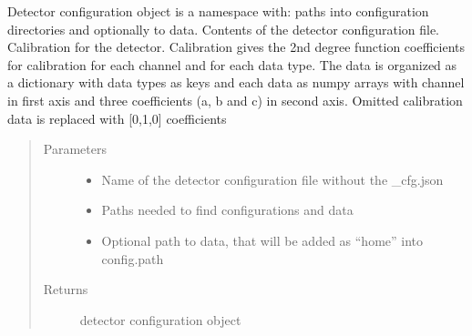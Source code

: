 \documentclass[letterpaper,10pt,english]{sphinxmanual}
\begin{document}
\begin{fulllineitems}
\label{\detokenize{autodocs/data:listmode.data.load_config}}
\sphinxAtStartPar
Detector configuration object is a namespace with:
paths into configuration directories and optionally to data.
Contents of the detector configuration file.
Calibration for the detector. Calibration gives the 2nd degree function coefficients for calibration for each
channel and for each data type. The data is organized as a dictionary with data types as keys and each data as
numpy arrays with channel in first axis and three coefficients (a, b and c) in second axis. Omitted calibration
data is replaced with {[}0,1,0{]} coefficients
\begin{quote}\begin{description}
\item[{Parameters}] \leavevmode\begin{itemize}
\item {} 
\sphinxAtStartPar
{} \textendash{} Name of the detector configuration file without the \_cfg.json

\item {} 
\sphinxAtStartPar
{} \textendash{} Paths needed to find configurations and data

\item {} 
\sphinxAtStartPar
{} \textendash{} Optional path to data, that will be added as “home” into config.path

\end{itemize}

\item[{Returns}] \leavevmode
\sphinxAtStartPar
detector configuration object

\end{description}\end{quote}

\end{fulllineitems}

\end{document}
